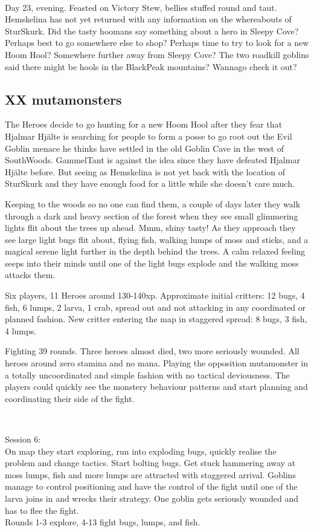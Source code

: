 \

Day 23, evening. Feasted on Victory Stew, bellies stuffed round and taut. Hemskelina has not yet returned with any information on the whereabouts of SturSkurk. Did the tasty hoomans say something about a hero in Sleepy Cove? Perhaps best to go somewhere else to shop? Perhaps time to try to look for a new Hoom Hool? Somewhere further away from Sleepy Cove? The two roadkill goblins said there might be hools in the BlackPeak mountains? Wannago check it out?


\subsection*{XX mutamonsters}

The Heroes decide to go hunting for a new Hoom Hool after they fear that Hjalmar Hjälte is searching for people to form a posse to go root out the Evil Goblin menace he thinks have settled in the old Goblin Cave in the west of SouthWoods. GammelTant is against the idea since they have defeated Hjalmar Hjälte before. But seeing as Hemskelina is not yet back with the location of SturSkurk and they have enough food for a little while she doesn't care much.

Keeping to the woods so no one can find them, a couple of days later they walk through a dark and heavy section of the forest when they see small glimmering lights flit about the trees up ahead. Mmm, shiny tasty! As they approach they see large light bugs flit about, flying fish, walking lumps of moss and sticks, and a magical serene light further in the depth behind the trees. A calm relaxed feeling seeps into their minds until one of the light bugs explode and the walking moss attacks them.

Six players, 11 Heroes around 130-140xp. Approximate initial critters: 12 bugs, 4 fish, 6 lumps, 2 larva, 1 crab, spread out and not attacking in any coordinated or planned fashion. New critter entering the map in staggered spread: 8 bugs, 3 fish, 4 lumps.

Fighting 39 rounds. Three heroes almost died, two more seriously wounded. All heroes around zero stamina and no mana.
Playing the opposition mutamonster in a totally uncoordinated and simple fashion with no tactical deviousness. The players could quickly see the monstery behaviour patterns and start planning and coordinating their side of the fight.

\

Session 6:\\                                                            %
On map they start exploring, run into exploding bugs, quickly realise the problem and change tactics. Start bolting bugs. Get stuck hammering away at moss lumps, fish and more lumps are attracted with staggered arrival. Goblins manage to control positioning and have the control of the fight until one of the larva joins in and wrecks their strategy. One goblin gets seriously wounded and has to flee the fight.\\
Rounds 1-3 explore, 4-13 fight bugs, lumps, and fish.

